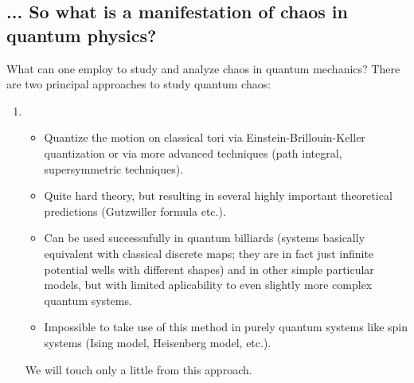 \documentclass[a4paper,11pt,twoside]{article}
\begin{document}
    \subsection{... So what is a manifestation of chaos in quantum physics?}
        What can one employ to study and analyze chaos in quantum mechanics?
        There are two principal approaches to study quantum chaos:
        \begin{enumerate}
            \item {}
                \begin{itemize}
                    \item Quantize the motion on classical tori via Einstein-Brillouin-Keller quantization or via more advanced techniques (path integral, supersymmetric techniques).
                    \item Quite hard theory, but resulting in several highly important theoretical predictions (Gutzwiller formula etc.).
                    \item Can be used successufully in quantum billiards (systems basically equivalent with classical discrete maps; they are in fact just infinite potential wells with different shapes) and in other simple particular models, but with limited aplicability to even slightly more complex quantum systems.
                    \item Impossible to take use of this method in purely quantum systems like spin systems (Ising model, Heisenberg model, etc.).
                \end{itemize}
                We will touch only a little from this approach.


\end{enumerate}
\end{document}
